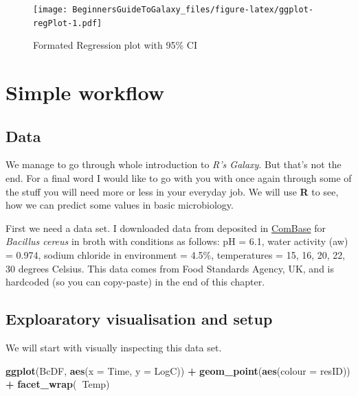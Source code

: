 \documentclass[]{book}
\newenvironment{Shaded}{\begin{snugshade}}{\end{snugshade}}
\newcommand{\KeywordTok}[1]{\textcolor[rgb]{0.13,0.29,0.53}{\textbf{#1}}}
\newcommand{\DataTypeTok}[1]{\textcolor[rgb]{0.13,0.29,0.53}{#1}}
\newcommand{\StringTok}[1]{\textcolor[rgb]{0.31,0.60,0.02}{#1}}
\newcommand{\OperatorTok}[1]{\textcolor[rgb]{0.81,0.36,0.00}{\textbf{#1}}}
\newcommand{\NormalTok}[1]{#1}
\theoremstyle{definition}
\theoremstyle{definition}
\theoremstyle{definition}
\theoremstyle{remark}
\begin{document}
\begin{figure}
\centering
\texttt{[image: BeginnersGuideToGalaxy\_files/figure-latex/ggplot-regPlot-1.pdf]}
\caption{\label{fig:ggplot-regPlot}Formated Regression plot with 95\% CI}
\end{figure}

\chapter{Simple workflow}\label{simple-workflow}

\section{Data}\label{data}

We manage to go through whole introduction to \emph{R's Galaxy}. But
that's not the end. For a final word I would like to go with you with
once again through some of the stuff you will need more or less in your
everyday job. We will use \textbf{R} to see, how we can predict some
values in basic microbiology.

First we need a data set. I downloaded data from deposited in
\href{https://www.combase.cc/index.php/en/}{ComBase} for \emph{Bacillus
cereus} in broth with conditions as follows: pH = 6.1, water activity
(aw) = 0.974, sodium chloride in environment = 4.5\%, temperatures = 15,
16, 20, 22, 30 degrees Celsius. This data comes from Food Standards
Agency, UK, and is hardcoded (so you can copy-paste) in the end of this
chapter.

\section{Exploaratory visualisation and
setup}\label{exploaratory-visualisation-and-setup}

We will start with visually inspecting this data set.

\begin{Shaded}
\begin{Highlighting}[]
\KeywordTok{ggplot}\NormalTok{(BcDF, }\KeywordTok{aes}\NormalTok{(}\DataTypeTok{x =}\NormalTok{ Time, }\DataTypeTok{y =}\NormalTok{ LogC)) }\OperatorTok{+}\StringTok{ }
\StringTok{  }\KeywordTok{geom_point}\NormalTok{(}\KeywordTok{aes}\NormalTok{(}\DataTypeTok{colour =}\NormalTok{ resID)) }\OperatorTok{+}
\StringTok{  }\KeywordTok{facet_wrap}\NormalTok{(}\OperatorTok{~}\NormalTok{Temp)}
\end{Highlighting}
\end{Shaded}
\end{document}
